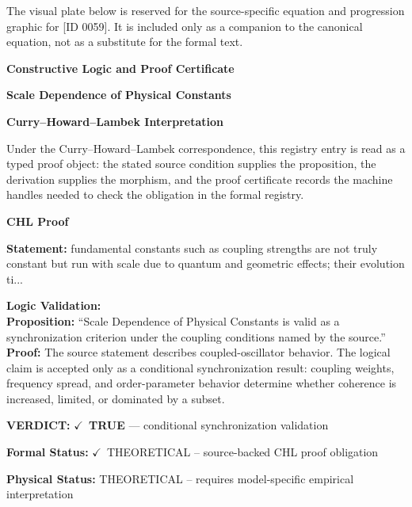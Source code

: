 \begingroup\footnotesize\sloppy
The visual plate below is reserved for the source-specific equation and progression graphic for [ID 0059]. It is included only as a companion to the canonical equation, not as a substitute for the formal text.
\par\endgroup
\ifTZPDarkEdition
{}
\fi

\clearpage
\begingroup\tzpsupportsetup
\noindent\textbf{\fontsize{10.8pt}{12.8pt}\selectfont [ID 0059] Constructive Logic and Proof Certificate}\par
\noindent\textbf{\fontsize{10pt}{12pt}\selectfont Scale Dependence of Physical Constants}\par
\vspace{0.45em}
\begingroup
\footnotesize
\setlength{\parskip}{0.22em}
\setlength{\parindent}{0pt}
\noindent\textbf{Curry--Howard--Lambek Interpretation}\par
Under the Curry--Howard--Lambek correspondence, this registry entry is read as a typed proof
object: the stated source condition supplies the proposition, the derivation supplies the
morphism, and the proof certificate records the machine handles needed to check the obligation
in the formal registry.

\vspace{0.45em}
\noindent\textbf{CHL Proof}\par
\textbf{Statement:} fundamental constants such as coupling strengths are not truly constant but run with
scale due to quantum and geometric effects; their evolution ti...

\textbf{Logic Validation:}\\
\textbf{Proposition:} ``Scale Dependence of Physical Constants is valid as a synchronization criterion under the
coupling conditions named by the source.''\\
\textbf{Proof:} The source statement describes coupled-oscillator behavior. The logical claim is
accepted only as a conditional synchronization result: coupling weights, frequency
spread, and order-parameter behavior determine whether coherence is increased, limited,
or dominated by a subset.

\textbf{VERDICT:} \ensuremath{\checkmark}\ \textbf{TRUE} --- conditional synchronization validation

\textbf{Formal Status:} \ensuremath{\checkmark}\ THEORETICAL -- source-backed CHL proof obligation

\textbf{Physical Status:} THEORETICAL -- requires model-specific empirical interpretation
\par\vspace{0.45em}
\par
\ifTZPDarkEdition
{}
\fi
\endgroup
\endgroup
